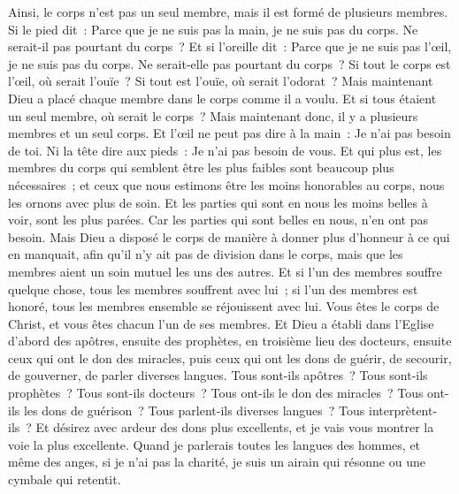\begin{multicols}{2}
Ainsi, le corps n'est pas un seul membre, mais il est formé de plusieurs membres.
Si le pied dit~: Parce que je ne suis pas la main, je ne suis pas du corps. Ne serait-il pas pourtant du corps~?
Et si l'oreille dit~: Parce que je ne suis pas l'œil, je ne suis pas du corps. Ne serait-elle pas pourtant du corps~?
Si tout le corps est l'œil, où serait l'ouïe~? Si tout est l'ouïe, où serait l'odorat~?
Mais maintenant Dieu a placé chaque membre dans le corps comme il a voulu.
Et si tous étaient un seul membre, où serait le corps~?
Mais maintenant donc, il y a plusieurs membres et un seul corps.
Et l'œil ne peut pas dire à la main~: Je n'ai pas besoin de toi. Ni la tête dire aux pieds~: Je n'ai pas besoin de vous.
Et qui plus est, les membres du corps qui semblent être les plus faibles sont beaucoup plus nécessaires~;
et ceux que nous estimons être les moins honorables au corps, nous les ornons avec plus de soin. Et les parties qui sont en nous les moins belles à voir, sont les plus parées. 
Car les parties qui sont belles en nous, n'en ont pas besoin. Mais Dieu a disposé le corps de manière à donner plus d'honneur à ce qui en manquait,
afin qu'il n'y ait pas de division dans le corps, mais que les membres aient un soin mutuel les uns des autres.
Et si l'un des membres souffre quelque chose, tous les membres souffrent avec lui~; si l'un des membres est honoré, tous les membres ensemble se réjouissent avec lui.
Vous êtes le corps de Christ, et vous êtes chacun l'un de ses membres.
Et Dieu a établi dans l'Eglise d'abord des apôtres, ensuite des prophètes, en troisième lieu des docteurs, ensuite ceux qui ont le don des miracles, puis ceux qui ont les dons de guérir, de secourir, de gouverner, de parler diverses langues.
Tous sont-ils apôtres~? Tous sont-ils prophètes~? Tous sont-ils docteurs~? Tous ont-ils le don des miracles~?
Tous ont-ils les dons de guérison~? Tous parlent-ils diverses langues~? Tous interprètent-ils~?
Et désirez avec ardeur des dons plus excellents, et je vais vous montrer la voie la plus excellente.
\VerseOne{}Quand je parlerais toutes les langues des hommes, et même des anges, si je n'ai pas la charité, je suis un airain qui résonne ou une cymbale qui retentit.

\end{multicols}
